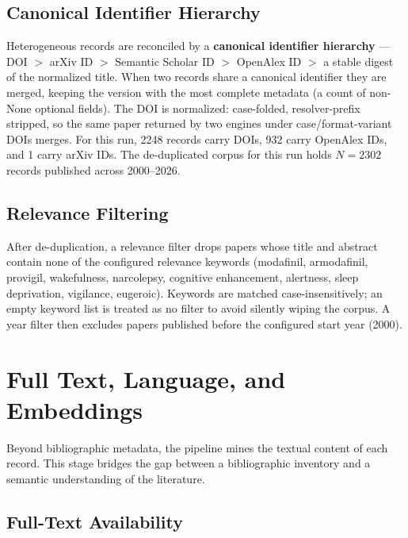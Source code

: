 \documentclass[
  english,
]{article}
\newcounter{none} %
\begin{document}
\subsection{Canonical Identifier
Hierarchy}\label{canonical-identifier-hierarchy}

Heterogeneous records are reconciled by a \textbf{canonical identifier
hierarchy} --- DOI \(>\) arXiv ID \(>\) Semantic Scholar ID \(>\)
OpenAlex ID \(>\) a stable digest of the normalized title. When two
records share a canonical identifier they are merged, keeping the
version with the most complete metadata (a count of non-None optional
fields). The DOI is normalized: case-folded, resolver-prefix stripped,
so the same paper returned by two engines under case/format-variant DOIs
merges. For this run, 2248 records carry DOIs, 932 carry OpenAlex IDs,
and 1 carry arXiv IDs. The de-duplicated corpus for this run holds
\(N = 2302\) records published across 2000--2026.

\subsection{Relevance Filtering}\label{relevance-filtering}

After de-duplication, a relevance filter drops papers whose title and
abstract contain none of the configured relevance keywords (modafinil,
armodafinil, provigil, wakefulness, narcolepsy, cognitive enhancement,
alertness, sleep deprivation, vigilance, eugeroic). Keywords are matched
case-insensitively; an empty keyword list is treated as no filter to
avoid silently wiping the corpus. A year filter then excludes papers
published before the configured start year (2000).

\newpage

\section{Full Text, Language, and
Embeddings}\label{full-text-language-and-embeddings}

Beyond bibliographic metadata, the pipeline mines the textual content of
each record. This stage bridges the gap between a bibliographic
inventory and a semantic understanding of the literature.

\subsection{Full-Text Availability}\label{full-text-availability}
\end{document}
